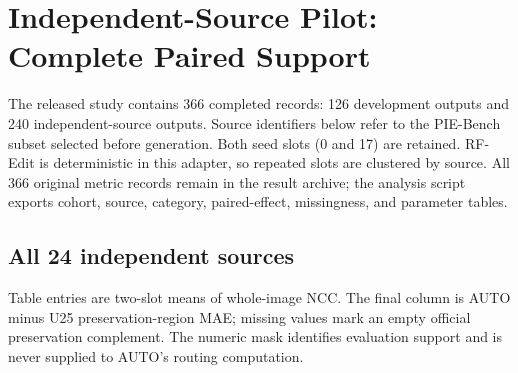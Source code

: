 \clearpage
\section{Independent-Source Pilot: Complete Paired Support}
\label{sec:r81-appendix}
The released study contains 366 completed records: 126 development outputs and 240 independent-source outputs. Source identifiers below refer to the PIE-Bench subset selected before generation. Both seed slots (0 and 17) are retained. RF-Edit is deterministic in this adapter, so repeated slots are clustered by source. All 366 original metric records remain in the result archive; the analysis script exports cohort, source, category, paired-effect, missingness, and parameter tables.

\subsection{All 24 independent sources}
Table entries are two-slot means of whole-image NCC. The final column is AUTO minus U25 preservation-region MAE; missing values mark an empty official preservation complement. The numeric mask identifies evaluation support and is never supplied to AUTO's routing computation.
\onecolumn
\small
